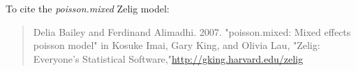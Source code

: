 To cite the \emph{ poisson.mixed } Zelig model:
 \begin{verse}
 Delia Bailey and Ferdinand Alimadhi. 2007. "poisson.mixed: Mixed effects poisson model" in Kosuke Imai, Gary King, and Olivia Lau, "Zelig: Everyone's Statistical Software,"\url{http://gking.harvard.edu/zelig} 
\end{verse}